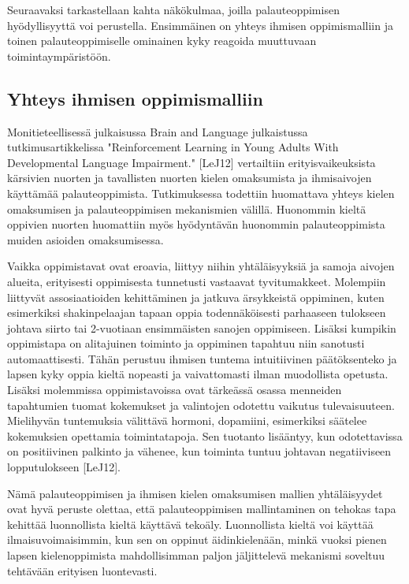 \documentclass[finnish]{tktltiki2}
\theoremstyle{definition}
\theoremstyle{remark}
\begin{document}
Seuraavaksi tarkastellaan kahta näkökulmaa, joilla palauteoppimisen hyödyllisyyttä voi perustella. Ensimmäinen on yhteys ihmisen oppimismalliin ja toinen palauteoppimiselle ominainen kyky reagoida muuttuvaan toimintaympäristöön.

\subsection{Yhteys ihmisen oppimismalliin}

Monitieteellisessä julkaisussa Brain and Language julkaistussa tutkimusartikkelissa "Reinforcement Learning in Young Adults With Developmental Language Impairment." [LeJ12] vertailtiin erityisvaikeuksista kärsivien nuorten ja tavallisten nuorten kielen omaksumista ja ihmisaivojen käyttämää palauteoppimista. Tutkimuksessa todettiin huomattava yhteys kielen omaksumisen ja palauteoppimisen mekanismien välillä. Huonommin kieltä oppivien nuorten huomattiin myös hyödyntävän huonommin palauteoppimista muiden asioiden omaksumisessa. 
 
Vaikka oppimistavat ovat eroavia, liittyy niihin yhtäläisyyksiä ja samoja aivojen alueita, erityisesti oppimisesta tunnetusti vastaavat tyvitumakkeet. Molempiin liittyvät assosiaatioiden kehittäminen ja jatkuva ärsykkeistä oppiminen, kuten esimerkiksi shakinpelaajan tapaan oppia todennäköisesti parhaaseen tulokseen johtava siirto tai 2-vuotiaan ensimmäisten sanojen oppimiseen. Lisäksi kumpikin oppimistapa on alitajuinen toiminto ja oppiminen tapahtuu niin sanotusti automaattisesti. Tähän perustuu ihmisen tuntema intuitiivinen päätöksenteko ja lapsen kyky oppia kieltä nopeasti ja vaivattomasti ilman muodollista opetusta. Lisäksi molemmissa oppimistavoissa ovat tärkeässä osassa menneiden tapahtumien tuomat kokemukset ja valintojen odotettu vaikutus tulevaisuuteen. Mielihyvän tuntemuksia välittävä hormoni, dopamiini, esimerkiksi säätelee kokemuksien opettamia toimintatapoja. Sen tuotanto lisääntyy, kun odotettavissa on positiivinen palkinto ja vähenee, kun toiminta tuntuu johtavan negatiiviseen lopputulokseen [LeJ12]. 
 
Nämä palauteoppimisen ja ihmisen kielen omaksumisen mallien yhtäläisyydet ovat hyvä peruste olettaa, että palauteoppimisen mallintaminen on tehokas tapa kehittää luonnollista kieltä käyttävä tekoäly. Luonnollista kieltä voi käyttää ilmaisuvoimaisimmin, kun sen on oppinut äidinkielenään, minkä vuoksi pienen lapsen kielenoppimista mahdollisimman paljon jäljittelevä mekanismi soveltuu tehtävään erityisen luontevasti.
\end{document}
